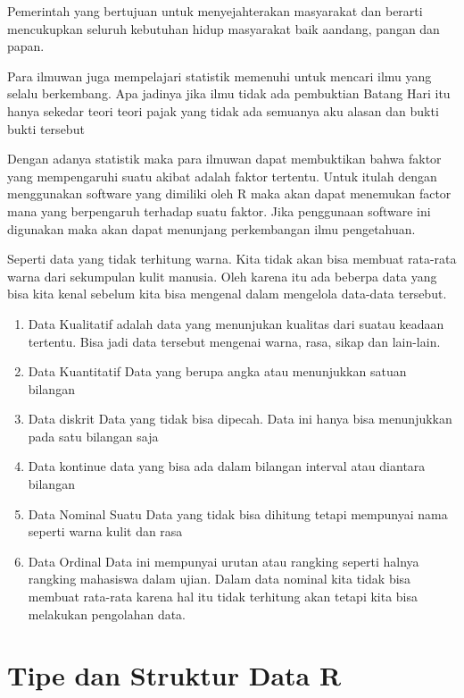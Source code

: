 \documentclass[
]{book}
\theoremstyle{definition}
\theoremstyle{definition}
\theoremstyle{definition}
\theoremstyle{definition}
\theoremstyle{remark}
\begin{document}
Pemerintah yang bertujuan untuk menyejahterakan masyarakat dan berarti mencukupkan seluruh kebutuhan hidup masyarakat baik aandang, pangan dan papan.

Para ilmuwan juga mempelajari statistik memenuhi untuk mencari ilmu yang selalu berkembang. Apa jadinya jika ilmu tidak ada pembuktian Batang Hari itu hanya sekedar teori teori pajak yang tidak ada semuanya aku alasan dan bukti bukti tersebut

Dengan adanya statistik maka para ilmuwan dapat membuktikan bahwa faktor yang mempengaruhi suatu akibat adalah faktor tertentu. Untuk itulah dengan menggunakan software yang dimiliki oleh R maka akan dapat menemukan factor mana yang berpengaruh terhadap suatu faktor. Jika penggunaan software ini digunakan maka akan dapat menunjang perkembangan ilmu pengetahuan.

Seperti data yang tidak terhitung warna. Kita tidak akan bisa membuat rata-rata warna dari sekumpulan kulit manusia. Oleh karena itu ada beberpa data yang bisa kita kenal sebelum kita bisa mengenal dalam mengelola data-data tersebut.

\begin{enumerate}
\def\labelenumi{\arabic{enumi}.}
\item
  Data Kualitatif adalah data yang menunjukan kualitas dari suatau keadaan tertentu. Bisa jadi data tersebut mengenai warna, rasa, sikap dan lain-lain.
\item
  Data Kuantitatif
  Data yang berupa angka atau menunjukkan satuan bilangan
\item
  Data diskrit
  Data yang tidak bisa dipecah. Data ini hanya bisa menunjukkan pada satu bilangan saja
\item
  Data kontinue data yang bisa ada dalam bilangan interval atau diantara bilangan
\item
  Data Nominal
  Suatu Data yang tidak bisa dihitung tetapi mempunyai nama seperti warna kulit dan rasa
\item
  Data Ordinal
  Data ini mempunyai urutan atau rangking seperti halnya rangking mahasiswa dalam ujian.
  Dalam data nominal kita tidak bisa membuat rata-rata karena hal itu tidak terhitung akan tetapi kita bisa melakukan pengolahan data.
\end{enumerate}

\hypertarget{tipe-dan-struktur-data-r}{%
\chapter{Tipe dan Struktur Data R}\label{tipe-dan-struktur-data-r}}
\end{document}
